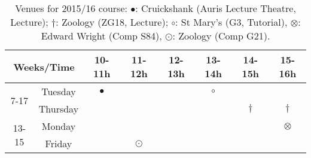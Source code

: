\documentclass[12pts,a4paper,amsmath,amssymb,floatfix]{article}%
\begin{document}
\begin{table}[h]
\begin{center}
\begin{tabular}{ c || c | c c c c c c}
\hline\hline
\multicolumn{2}{c}{\bf Weeks/Time} & {\bf 10-11h} & {\bf 11-12h} & {\bf 12-13h} & {\bf 13-14h} & {\bf 14-15h} & {\bf 15-16h}  \\
\hline\hline
\multirow{2}{*}{7-17}  & Tuesday    & $\bullet$   &              &              &   $\circ$    &              &               \\
                       & Thursday   &             &              &              &              &   $\dagger$  &   $\dagger$   \\
\hline 
\multirow{2}{*}{13-15} & Monday     &             &              &              &              &              &   $\otimes$ \\
                       & Friday     &             &  $\odot$     &              &              &              &             \\
\hline
\end{tabular}
\end{center}
\caption{Venues for 2015/16 course: $\bullet$: Cruickshank (Auris Lecture Theatre, Lecture); $\dagger$: Zoology (ZG18, Lecture); $\circ$: St Mary's (G3, Tutorial), $\otimes$: Edward Wright (Comp S84), $\odot$: Zoology (Comp G21).}
\label{table:timetable}
\end{table}
\end{document}

